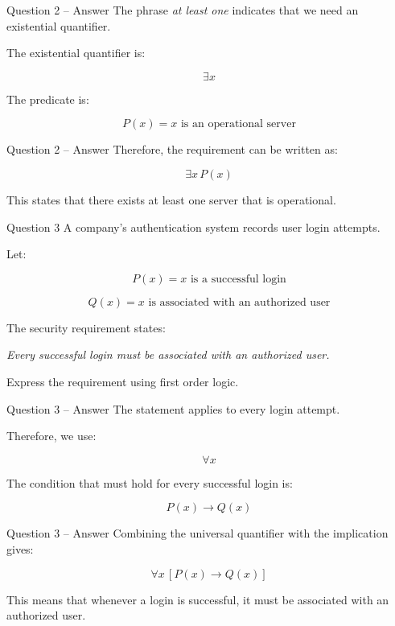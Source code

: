 \begin{frame}{Question 2 -- Answer}
The phrase \textit{at least one} indicates that we need an existential
quantifier.

The existential quantifier is:

$$
\exists x
$$

The predicate is:

$$
P(x) = \text{$x$ is an operational server}
$$

\end{frame}

\begin{frame}{Question 2 -- Answer}
Therefore, the requirement can be written as:

$$
\boxed{\exists x\,P(x)}
$$

This states that there exists at least one server that is operational.
\end{frame}


\begin{frame}{Question 3}
A company's authentication system records user login attempts.

Let:

$$
P(x) = \text{$x$ is a successful login}
$$

$$
Q(x) = \text{$x$ is associated with an authorized user}
$$

The security requirement states:

\begin{center}
\textit{Every successful login must be associated with an authorized user.}
\end{center}

Express the requirement using first order logic.
\end{frame}

\begin{frame}{Question 3 -- Answer}
The statement applies to every login attempt.

Therefore, we use:

$$
\forall x
$$

The condition that must hold for every successful login is:

$$
P(x) \rightarrow Q(x)
$$

\end{frame}

\begin{frame}{Question 3 -- Answer}
Combining the universal quantifier with the implication gives:

$$
\boxed{\forall x\,[P(x)\rightarrow Q(x)]}
$$

This means that whenever a login is successful, it must be associated
with an authorized user.
\end{frame}

